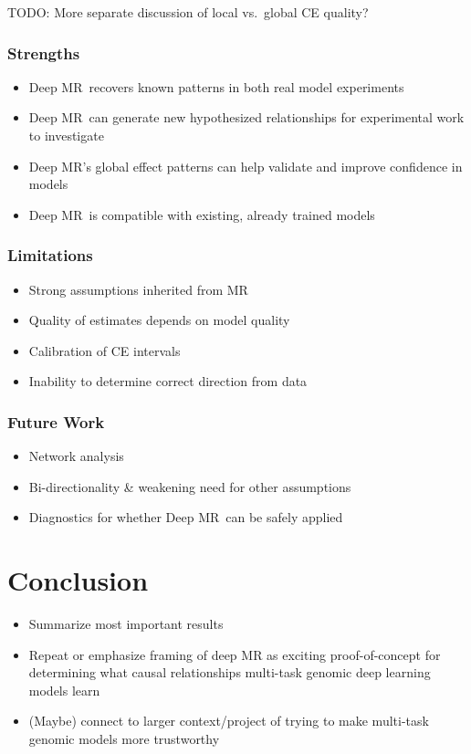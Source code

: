 \documentclass[twoside,11pt]{article}
\newcommand{\method}{{Deep MR}}
\begin{document}
TODO: More separate discussion of local vs.\ global CE quality?

\subsubsection{Strengths}%
\label{ssub:strengths}
\begin{itemize}
	\item \method\ recovers known patterns in both real model experiments
	\item \method\ can generate new hypothesized relationships for experimental work to investigate
	\item \method's global effect patterns can help validate and improve confidence in models
	\item \method\ is compatible with existing, already trained models 
\end{itemize}

\subsubsection{Limitations}%
\label{ssub:limitations}
\begin{itemize}
	\item Strong assumptions inherited from MR
	\item Quality of estimates depends on model quality
	\item Calibration of CE intervals
	\item Inability to determine correct direction from data
\end{itemize}

\subsubsection{Future Work}%
\label{ssub:future_work}
\begin{itemize}
	\item Network analysis
	\item Bi-directionality \& weakening need for other assumptions
	\item Diagnostics for whether \method\ can be safely applied
\end{itemize}

\section{Conclusion}%
\label{sec:conclusion}
\begin{itemize}
	\item Summarize most important results
	\item Repeat or emphasize framing of deep MR as exciting proof-of-concept for determining what causal relationships multi-task genomic deep learning models learn
	\item (Maybe) connect to larger context/project of trying to make multi-task genomic models more trustworthy
\end{itemize}





\newpage

\appendix

\vskip 0.2in

\end{document}
